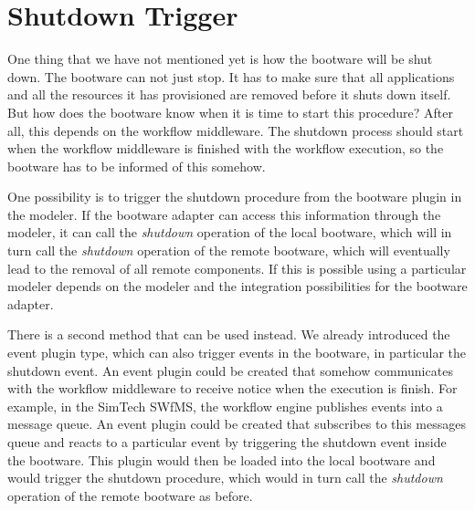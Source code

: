 \section{Shutdown Trigger}
\label{design:shutdown}

One thing that we have not mentioned yet is how the bootware will be shut down.
The bootware can not just stop.
It has to make sure that all applications and all the resources it has provisioned are removed before it shuts down itself.
But how does the bootware know when it is time to start this procedure?
After all, this depends on the workflow middleware.
The shutdown process should start when the workflow middleware is finished with the workflow execution, so the bootware has to be informed of this somehow.

One possibility is to trigger the shutdown procedure from the bootware plugin in the modeler.
If the bootware adapter can access this information through the modeler, it can call the \textit{shutdown} operation of the local bootware, which will in turn call the \textit{shutdown} operation of the remote bootware, which will eventually lead to the removal of all remote components.
If this is possible using a particular modeler depends on the modeler and the integration possibilities for the bootware adapter.

There is a second method that can be used instead.
We already introduced the event plugin type, which can also trigger events in the bootware, in particular the shutdown event.
An event plugin could be created that somehow communicates with the workflow middleware to receive notice when the execution is finish.
For example, in the SimTech SWfMS, the workflow engine publishes events into a message queue.
An event plugin could be created that subscribes to this messages queue and reacts to a particular event by triggering the shutdown event inside the bootware.
This plugin would then be loaded into the local bootware and would trigger the shutdown procedure, which would in turn call the \textit{shutdown} operation of the remote bootware as before.

